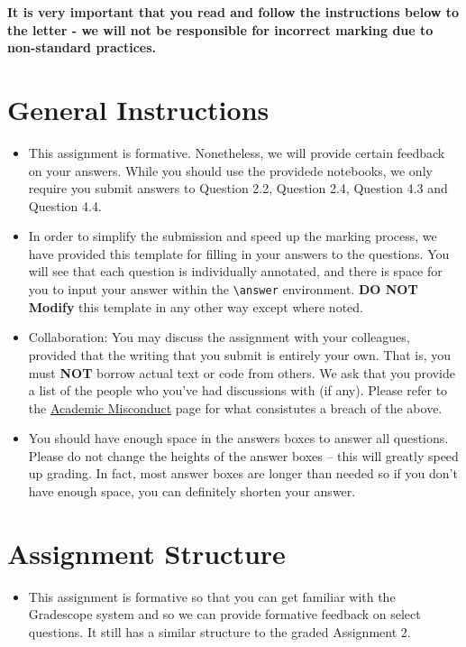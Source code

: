 \documentclass[12pt]{article}
\begin{document}
\maketitle
\thispagestyle{empty}


\noindent \textbf{It is very important that you read and follow the instructions below to the letter - we will not be responsible for incorrect marking due to non-standard practices.}

\section*{General Instructions}
\begin{itemize}
\item This assignment is formative. Nonetheless, we will provide certain feedback on your answers. While you should use the providede notebooks, we only require you submit answers to Question 2.2, Question 2.4, Question 4.3 and Question 4.4.
\item In order to simplify the submission and speed up the marking process, we have provided this template for filling in your answers to the questions. You will see that each question is individually annotated, and there is space for you to input your answer within the \texttt{\textbackslash answer} environment. \textbf{DO NOT Modify} this template in any other way except where noted.
\item Collaboration: You may discuss the assignment with your colleagues, provided that the writing that you submit is entirely your own. That is, you must \textbf{NOT} borrow actual text or code from others. We ask that you provide a list of the people who you've had discussions with (if any). Please refer to the \href{http://web.inf.ed.ac.uk/infweb/admin/policies/academic-misconduct}{Academic Misconduct} page for what consistutes a breach of the above.
\item You should have enough space in the answers boxes to answer all questions. Please do not change the heights of the answer boxes -- this will greatly speed up grading. In fact, most answer boxes are longer than needed so if you don't have enough space, you can definitely shorten your answer.
\end{itemize}

\section*{Assignment Structure}
\begin{itemize}
\item This assignment is formative so that you can get familiar with the Gradescope system and so we can provide formative feedback on select questions. It still has a similar structure to the graded Assignment 2. 
\end{itemize}
\end{document}
